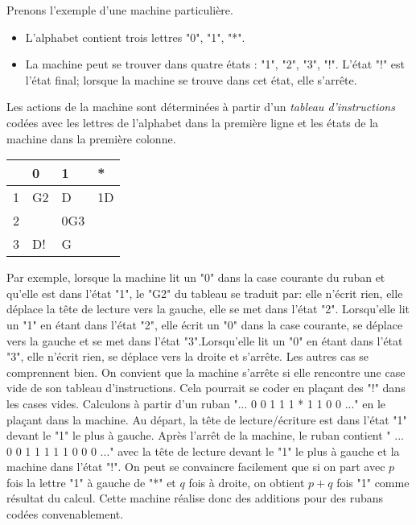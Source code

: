 Prenons l'exemple d'une machine particulière.
\begin{itemize}
  \item L'alphabet contient trois lettres "0", "1", "*".
  \item La machine peut se trouver dans quatre états : "1", "2", "3", "!". L'état "!" est l'état final; lorsque la machine se trouve dans cet état, elle s'arrête. 
\end{itemize}
Les actions de la machine sont déterminées à partir d'un \emph{tableau d'instructions} codées avec les lettres de l'alphabet dans la première ligne et les états de la machine dans la première colonne.
\begin{center}
\renewcommand{\arraystretch}{1.5}
\begin{tabular}{|l|l|l|l|} \hline
  & 0  & 1   & *  \\ \hline
1 & G2 & D   & 1D \\ \hline
2 &    & 0G3 &    \\ \hline
3 & D! & G   &    \\ \hline
\end{tabular}
\end{center}
Par exemple, lorsque la machine lit un "0" dans la case courante du ruban et qu'elle est dans l'état "1", le "G2" du tableau se traduit par: elle n'écrit rien, elle déplace la tête de lecture vers la gauche, elle se met dans l'état "2".\newline
Lorsqu'elle lit un "1" en étant dans l'état "2", elle écrit un "0" dans la case courante, se déplace vers la gauche et se met dans l'état "3".\newline Lorsqu'elle lit un "0" en étant dans l'état "3", elle n'écrit rien, se déplace vers la droite et s'arrête. Les autres cas se comprennent bien. On convient que la machine s'arrête si elle rencontre une case vide de son tableau d'instructions. Cela pourrait se coder en plaçant des "!" dans les cases vides.\newline
Calculons à partir d'un ruban "... 0 0 1 1 1 * 1 1 0 0 ..." en le plaçant dans la machine. Au départ, la tête de lecture/écriture est dans l'état "1" devant le "1" le plus à gauche.\newline
Après l'arrêt de la machine, le ruban contient " ... 0 0 1 1 1 1 1 0 0 0 ..." avec la tête de lecture devant le "1" le plus à gauche et la machine dans l'état "!".\newline
On peut se convaincre facilement que si on part avec $p$ fois la lettre "1" à gauche de "*" et $q$ fois à droite, on obtient $p+q$ fois "1" comme résultat du calcul. Cette machine réalise donc des additions pour des rubans codées convenablement.

